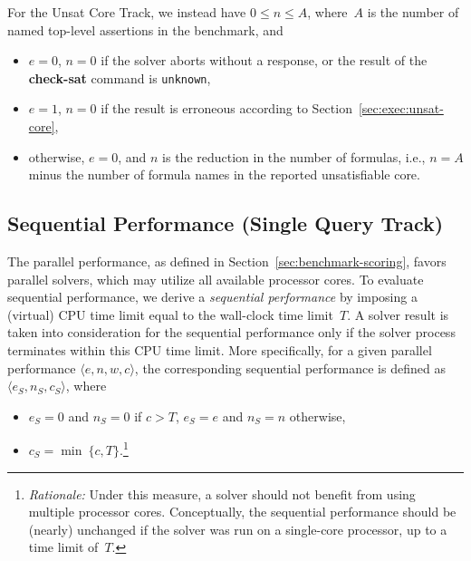 \documentclass[12pt]{article}
\newcommand{\akey}[1]{\textbf{#1}}
\newcommand{\maintrack}{Single Query Track\xspace}
\newcommand{\ucoretrack}{Unsat Core Track\xspace}
\begin{document}
\header{\ucoretrack.}
%
For the \ucoretrack, we instead have $0 \leq n \leq A$, where~$A$
is the number of named top-level assertions in the benchmark, and
\begin{itemize}
\item $e=0$, $n=0$ if the solver aborts without a response, or the
  result of the \akey{check-sat} command is \texttt{unknown},
\item $e=1$, $n=0$ if the result is erroneous according to
  Section~\ref{sec:exec:unsat-core},
\item otherwise, $e=0$, and $n$ is the reduction in the number of
  formulas, i.e., $n = A$ minus the number of formula names in the
  reported unsatisfiable core.
\end{itemize}

\subsection{Sequential Performance (\maintrack)}
\label{sec:sequential}


\iffalse
SMT-COMP has traditionally emphasized sequential performance (i.e.,
CPU time) over parallel performance (i.e., wall-clock time).  StarExec
measures both, and we intend to recognize both best sequential and
best parallel solvers in all competitive \maintrack divisions.
\fi

The parallel performance, as defined in Section~\ref{sec:benchmark-scoring},
favors parallel solvers, which may utilize all available processor
cores.  To evaluate sequential performance, we derive a
\emph{sequential performance} by imposing a (virtual) CPU time limit equal
to the wall-clock time limit~$T$.  A solver result is taken into
consideration for the sequential performance only if the solver process
terminates within this CPU time limit.  More specifically, for a given
parallel performance $\langle e, n, w, c\rangle$, the corresponding sequential
performance is defined as~$\langle e_S, n_S, c_S\rangle$, where
\begin{itemize}
\item $e_S = 0$ and $n_S = 0$ if $c > T$, $e_S = e$ and $n_S = n$
  otherwise,
\item $c_S = \min\ \{c, T\}$.\footnote{\emph{Rationale:} Under this
  measure, a solver should not benefit from using multiple processor
  cores.  Conceptually, the sequential performance should be (nearly)
  unchanged if the solver was run on a single-core processor, up to a
  time limit of~$T$.}
\end{itemize}
\end{document}
